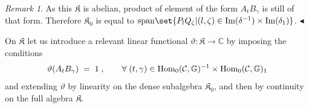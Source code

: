 \documentclass[a4paper,12pt,twoside,reqno]{amsart}
\theoremstyle{plain}
\theoremstyle{definition}
\theoremstyle{remark}
\newtheorem{remark}[teo]{Remark}
\numberwithin{equation}{section}
\numberwithin{figure}{section}
\numberwithin{table}{section}
\newcommand{\f}[1]{\mathcal{#1}}
\newcommand{\n}[1]{\mathbb{#1}}
\begin{document}
	
	
	
	
	
	\medskip
	
	
	
	
	
	\begin{remark}\label{rk:generators_K}
		As this $\mathfrak{K}$ is abelian, product of element of the form $A_tB_\gamma$ is still of that form. Therefore $\mathfrak{K}_0$ is equal to ${\rm span}\set{P_{l}Q_{\zeta}\lvert (l,\zeta)\in {\rm Im}(\delta^{-1})\times {\rm Im}(\delta_1)}$. \hfill $\blacktriangleleft$
	\end{remark}
	
	
	
	
	\medskip
	
	
	
	
	
	On  $\mathfrak{K}$ let us introduce a relevant linear functional $\vartheta:\mathfrak{K}\to\n{C}$ by imposing the conditions
	\begin{equation}\label{eq:def_eta}
		\vartheta(A_tB_\gamma)\;=\;1\;, \qquad \forall \;(t,\gamma)\in {\rm Hom}_0(\f{C},\n{G})^{-1}\times {\rm Hom}_0(\f{C},\n{G})_1
	\end{equation}
	and extending  $\vartheta$ by linearity on the dense subalgebra $\mathfrak{K}_0$, and then by continuity on the 
	full algebra 
	$\mathfrak{K}$.
	
	
	
	
	
\end{document}
